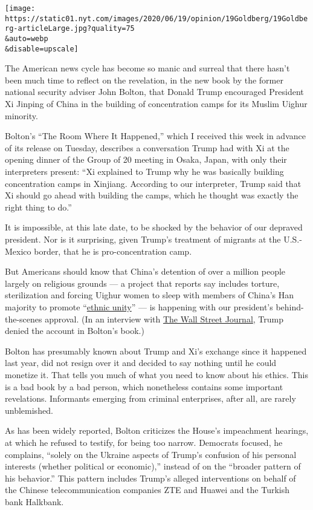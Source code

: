\texttt{[image: https://static01.nyt.com/images/2020/06/19/opinion/19Goldberg/19Goldberg-articleLarge.jpg?quality=75\\\&auto=webp\\\&disable=upscale]}

The American news cycle has become so manic and surreal that there
hasn't been much time to reflect on the revelation, in the new book by
the former national security adviser John Bolton, that Donald Trump
encouraged President Xi Jinping of China in the building of
concentration camps for its Muslim Uighur minority.

Bolton's ``The Room Where It Happened,'' which I received this week in
advance of its release on Tuesday, describes a conversation Trump had
with Xi at the opening dinner of the Group of 20 meeting in Osaka,
Japan, with only their interpreters present: ``Xi explained to Trump why
he was basically building concentration camps in Xinjiang. According to
our interpreter, Trump said that Xi should go ahead with building the
camps, which he thought was exactly the right thing to do.''

It is impossible, at this late date, to be shocked by the behavior of
our depraved president. Nor is it surprising, given Trump's treatment of
migrants at the U.S.-Mexico border, that he is pro-concentration camp.

But Americans should know that China's detention of over a million
people largely on religious grounds --- a project that reports say
includes torture, sterilization and forcing Uighur women to sleep with
members of China's Han majority to promote
``\href{https://www.nzherald.co.nz/world/news/article.cfm?c_id=2\&objectid=12295956}{ethnic
unity}'' --- is happening with our president's behind-the-scenes
approval. (In an interview with
\href{https://www.wsj.com/articles/transcript-of-president-trumps-interview-with-the-wall-street-journal-11592501000}{The
Wall Street Journal}, Trump denied the account in Bolton's book.)

Bolton has presumably known about Trump and Xi's exchange since it
happened last year, did not resign over it and decided to say nothing
until he could monetize it. That tells you much of what you need to know
about his ethics. This is a bad book by a bad person, which nonetheless
contains some important revelations. Informants emerging from criminal
enterprises, after all, are rarely unblemished.

As has been widely reported, Bolton criticizes the House's impeachment
hearings, at which he refused to testify, for being too narrow.
Democrats focused, he complains, ``solely on the Ukraine aspects of
Trump's confusion of his personal interests (whether political or
economic),'' instead of on the ``broader pattern of his behavior.'' This
pattern includes Trump's alleged interventions on behalf of the Chinese
telecommunication companies ZTE and Huawei and the Turkish bank
Halkbank.

